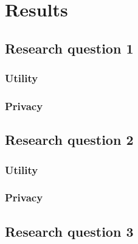 \chapter{Results}
\section{Research question 1}
\subsection{Utility}
\subsection{Privacy}
\section{Research question 2}
\subsection{Utility}
\subsection{Privacy}
\section{Research question 3}